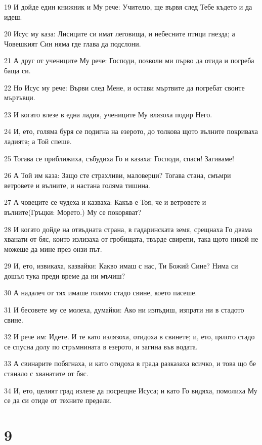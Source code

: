 \par 19 И дойде един книжник и Му рече: Учителю, ще вървя след Тебе където и да идеш.
\par 20 Исус му каза: Лисиците си имат леговища, и небесните птици гнезда; а Човешкият Син няма где глава да подслони.
\par 21 А друг от учениците Му рече: Господи, позволи ми първо да отида и погреба баща си.
\par 22 Но Исус му рече: Върви след Мене, и остави мъртвите да погребат своите мъртъвци.
\par 23 И когато влезе в една ладия, учениците Му влязоха подир Него.
\par 24 И, ето, голяма буря се подигна на езерото, до толкова щото вълните покриваха ладията; а Той спеше.
\par 25 Тогава се приближиха, събудиха Го и казаха: Господи, спаси! Загиваме!
\par 26 А Той им каза: Защо сте страхливи, маловерци? Тогава стана, смъмри ветровете и вълните, и настана голяма тишина.
\par 27 А човеците се чудеха и казваха: Какъв е Тоя, че и ветровете и вълните(Гръцки: Морето.) Му се покоряват?
\par 28 И когато дойде на отвъдната страна, в гадаринската земя, срещнаха Го двама хванати от бяс, които излизаха от гробищата, твърде свирепи, така щото никой не можеше да мине през онзи път.
\par 29 И, ето, извикаха, казвайки: Какво имаш с нас, Ти Божий Сине? Нима си дошъл тука преди време да ни мъчиш?
\par 30 А надалеч от тях имаше голямо стадо свине, което пасеше.
\par 31 И бесовете му се молеха, думайки: Ако ни изпъдиш, изпрати ни в стадото свине.
\par 32 И рече им: Идете. И те като излязоха, отидоха в свинете; и, ето, цялото стадо се спусна долу по стръмнината в езерото, и загина във водата.
\par 33 А свинарите побягнаха, и като отидоха в града разказаха всичко, и това що бе станало с хванатите от бяс.
\par 34 И, ето, целият град излезе да посрещне Исуса; и като Го видяха, помолиха Му се да си отиде от техните предели.

\chapter{9}

